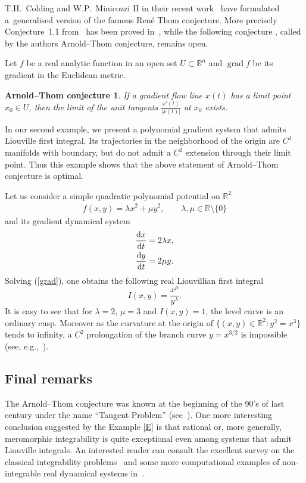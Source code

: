 \documentclass[10pt,a4paper]{amsart}
\numberwithin{equation}{section}
\newtheorem*{t*}{Arnold--Thom conjecture}
\newcommand{\R}{\mathbb{R}}
\def \grad{\operatorname{grad}}
\begin{document}
\begin{Example}\label{E}
T.H.~Colding and W.P.~Minicozzi II in their recent work~\cite{ARTH} have formulated a~generalised version of the famous Ren\'e Thom conjecture. More precisely Conjecture~1.1 from~\cite{ARTH} has been proved in~\cite{KK}, while the following conjecture \cite[Conjecture~1.2]{ARTH},
 called by the authors Arnold--Thom conjecture, remains open.

Let $f$ be a real analytic function in an open set $U \subset \R^n$ and $\grad f$ be its gradient in the Euclidean metric.

\begin{t*}
If a gradient flow line $x(t)$ has a limit point $x_0 \in U$, then the limit of the unit tangents $\frac{x'(t)}{|x(t)|}$ at $x_0$ exists.
\end{t*}

 In our second example, we present a polynomial gradient system that admits Liouville first integral. Its trajectories in the neighborhood of the origin are $C^1$ manifolds with boundary, but do not admit a $C^2$ extension through their limit point. Thus this example shows that the above statement of Arnold--Thom conjecture is optimal.

Let us consider a simple quadratic polynomial potential on $\mathbb{R}^2$
\begin{gather*}
f(x,y)=\lambda x^2+\mu y^2, \qquad \lambda,\mu \in \mathbb{R}\setminus \{0\}
\end{gather*}
and its gradient dynamical system
\begin{gather}
\frac{{\rm d}x}{{\rm d}t} = 2 \lambda x, \nonumber
\\
\frac{{\rm d}y}{{\rm d}t} = 2 \mu y.\label{grad}
\end{gather}
Solving (\ref{grad}), one obtains the following real Liouvillian first integral
\[
I(x,y)=\dfrac{x^{\mu}}{y^{\lambda}}.
\]
It is easy to see that for $\lambda=2$, $\mu=3$ and $I(x,y)=1$, the level curve is an ordinary cusp. Moreover as the curvature at the origin of $\big\{(x,y) \in \mathbb{R}^2 \colon y^2=x^3 \big\}$ tends to infinity, a $C^2$ prolongation of the branch curve $y=x^{3/2}$ is impossible (see, e.g.,~\cite[Theorem~5.1.6]{DFN}).
\end{Example}

\subsection{Final remarks}

The Arnold--Thom conjecture was known at the beginning of the 90's of last century under the name ``Tangent Problem'' (see~\cite[Section~9]{L}).
One more interesting conclusion suggested by the Example \ref{E} is that rational or, more generally, meromorphic integrability is quite exceptional even among systems that admit Liouville integrals. An interested reader can consult the excellent survey on the classical integrability problems~\cite{MP} and some more computational examples of non-integrable real dynamical systems in~\cite{HM}.
\end{document}
